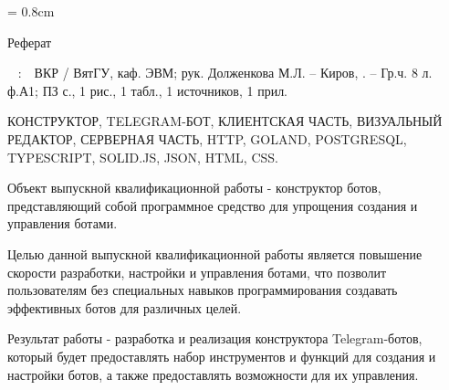 
{

\topskip = 0.8cm
\begin{center}
	Реферат
\end{center}

\vspace{1em}

\authori\
\topic
:\
\mbox{\tpga}\
ВКР / ВятГУ, каф. ЭВМ; рук.
Долженкова М.Л. – Киров, \the\year. –
Гр.ч. 8 л. ф.А1;
ПЗ \pageref{lastpage} с.,
1 рис.,
1 табл.,
1 источников,
1 прил.

\vspace{1.5em}

КОНСТРУКТОР,
TELEGRAM-БОТ,
КЛИЕНТСКАЯ ЧАСТЬ,
ВИЗУАЛЬНЫЙ РЕДАКТОР,
СЕРВЕРНАЯ ЧАСТЬ,
HTTP,
GOLAND,
POSTGRESQL,
TYPESCRIPT,
SOLID.JS,
JSON,
HTML,
CSS.

\vspace{1.5em}

Объект выпускной квалификационной работы -
конструктор ботов, представляющий собой
программное средство для упрощения
создания и управления ботами.

Целью данной выпускной квалификационной работы является повышение
скорости разработки, настройки и управления
ботами, что позволит пользователям
без специальных навыков
программирования создавать
эффективных ботов для различных целей.

Результат работы - разработка и реализация
конструктора Telegram-ботов,
который будет предоставлять
набор инструментов и
функций для создания и настройки
ботов, а также предоставлять
возможности для их управления.

}

